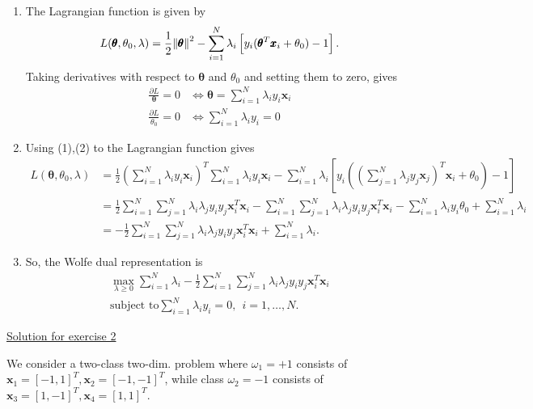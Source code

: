 \documentclass[12pt]{book}
\begin{document}
\begin{enumerate}[label=(\alph*)]
	\item The Lagrangian function is given by
	\begin{align*}
	L(\pmb{\theta},\theta_0,\lambda) = \frac{1}{2}\norm{\pmb{\theta}}^2 - \sum_{i=1}^{N}\lambda_i \left[  y_i(\pmb{\theta}^T\pmb{x}_i + \theta_0) -1 \right].
	\end{align*}
	Taking derivatives with respect to $\pmb{\theta}$ and $\theta_0$ and setting them to zero, gives
	\begin{align}
	\frac{\partial L}{\pmb{\theta}} = 0 & \iff \pmb{\theta} = \sum_{i=1}^{N}\lambda_i y_i \pmb{x}_i  \\
	\frac{\partial L}{\theta_0} = 0 & \iff  \sum_{i=1}^{N}\lambda_i y_i = 0
	\end{align}
	\item Using (1),(2) to the Lagrangian function gives
	\begin{align*}
	L(\pmb{\theta},\theta_0,\lambda) &= \frac{1}{2} \left( \sum_{i=1}^{N}\lambda_i y_i \pmb{x}_i \right)^T \sum_{i=1}^{N}\lambda_i y_i \pmb{x}_i  - \sum_{i=1}^{N}\lambda_i \left[  y_i\left(\left(\sum_{j=1}^{N}\lambda_j y_j \pmb{x}_j \right)^T\pmb{x}_i + \theta_0\right) -1 \right] \\
	&= \frac{1}{2}  \sum_{i=1}^{N} \sum_{j=1}^{N}\lambda_i \lambda_j y_i y_j \pmb{x}_i^T \pmb{x}_i - \sum_{i=1}^{N} \sum_{j=1}^{N}\lambda_i \lambda_j y_i y_j \pmb{x}_i^T \pmb{x}_i - \sum_{i=1}^{N}\lambda_i y_i \theta_0 + \sum_{i=1}^{N}\lambda_i \\
	&= -\frac{1}{2}  \sum_{i=1}^{N} \sum_{j=1}^{N}\lambda_i \lambda_j y_i y_j \pmb{x}_i^T \pmb{x}_i  + \sum_{i=1}^{N}\lambda_i.
	\end{align*}
	\item So, the Wolfe dual representation is
	\begin{align*}
	\max_{\lambda\ge 0} \sum_{i=1}^{N}\lambda_i - \frac{1}{2}  \sum_{i=1}^{N} \sum_{j=1}^{N}\lambda_i \lambda_j y_i y_j \pmb{x}_i^T \pmb{x}_i \\ \text{subject to} \sum_{i=1}^{N}\lambda_i y_i = 0 , \ \ i=1,\dots,N. \ \  \ \ \
	\end{align*}
\end{enumerate}



\vspace{0.3 cm}
{\underline{\large Solution for exercise 2}}
\vspace{0.3 cm}

We consider a two-class two-dim. problem where $\omega_1 = +1$ consists of $\pmb{x}_1=[-1,1]^T, \pmb{x}_2=[-1,-1]^T$, while class $\omega_2=-1$ consists of $\pmb{x}_3=[1,-1]^T, \pmb{x}_4=[1,1]^T$.
\end{document}

